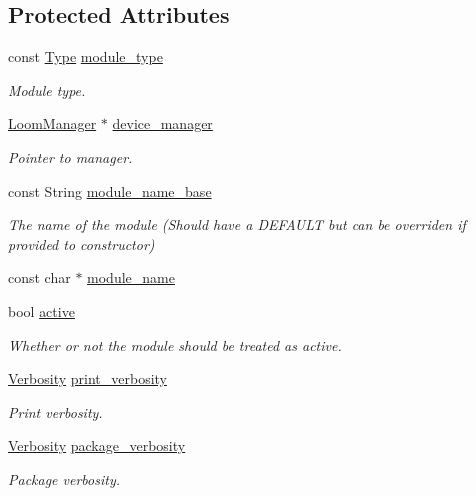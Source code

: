 \subsection*{Protected Attributes}
\begin{DoxyCompactItemize}
\item 
const \hyperlink{class_loom_module_aee91d0a75140d51ee428fc2d4417d865}{Type} \hyperlink{class_loom_module_a152d394f37236a2b159dae19da67eeb0}{module\+\_\+type}
\begin{DoxyCompactList}\small\item\em Module type. \end{DoxyCompactList}\item 
\hyperlink{class_loom_manager}{Loom\+Manager} $\ast$ \hyperlink{class_loom_module_a28fe8b2fb5a9a0d14bebe13ac1c92bdf}{device\+\_\+manager}
\begin{DoxyCompactList}\small\item\em Pointer to manager. \end{DoxyCompactList}\item 
const String \hyperlink{class_loom_module_a7cb2d5ef593dfc99e938c632f8843c84}{module\+\_\+name\+\_\+base}
\begin{DoxyCompactList}\small\item\em The name of the module (Should have a D\+E\+F\+A\+U\+LT but can be overriden if provided to constructor) \end{DoxyCompactList}\item 
const char $\ast$ \hyperlink{class_loom_module_adf6e68ad7e9fa2acfca7a8a280680764}{module\+\_\+name}
\item 
bool \hyperlink{class_loom_module_af61a7b93ef2b9acfc22c7ad7968a45c7}{active}
\begin{DoxyCompactList}\small\item\em Whether or not the module should be treated as active. \end{DoxyCompactList}\item 
\hyperlink{_misc_8h_abf3be10d03894afb391f3a2935e3b313}{Verbosity} \hyperlink{class_loom_module_a6e73663a6a5ebdcbe3f92153ca88ce8c}{print\+\_\+verbosity}
\begin{DoxyCompactList}\small\item\em Print verbosity. \end{DoxyCompactList}\item 
\hyperlink{_misc_8h_abf3be10d03894afb391f3a2935e3b313}{Verbosity} \hyperlink{class_loom_module_aec8db10ee69e265779822792f177f982}{package\+\_\+verbosity}
\begin{DoxyCompactList}\small\item\em Package verbosity. \end{DoxyCompactList}\end{DoxyCompactItemize}
